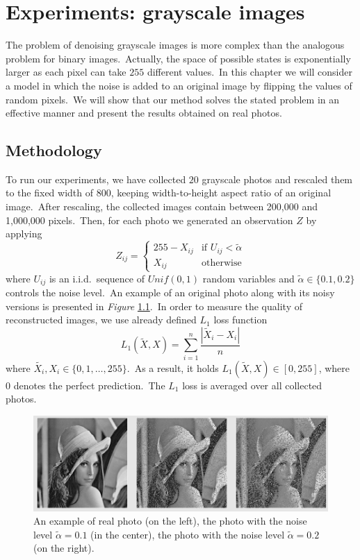 \documentclass[shortabstract, english, lic]{iithesis}
\newcommand\numberedchapter[1]{\setlength\topskip{3cm}\chapter{#1}\setlength\topskip{0cm}}
\theoremstyle{default_theorem_style}\newtheorem{theorem}{Theorem}
\theoremstyle{default_theorem_style}\newtheorem{definition}{Definition}
\begin{document}
\numberedchapter{Experiments: grayscale images}\label{chapter:grayscale_experiments}

The problem of denoising grayscale images is more complex than the analogous problem for binary
images.\ Actually, the space of possible states is exponentially larger as each pixel can take $255$ different
values.\ In this chapter we will consider a model in which the noise is added to an original image by flipping
the values of random pixels.\ We will show that our method solves the stated problem in an effective manner
and present the results obtained on real photos.

\section{Methodology}

To run our experiments, we have collected $20$ grayscale photos and rescaled them to the fixed width of $800$,
keeping width-to-height aspect ratio of an original image.\ After rescaling, the collected images contain between
200,000 and 1,000,000 pixels.\ Then, for each photo we generated an observation $Z$ by applying
$$
Z_{ij} =
\begin{cases}
  255 - X_{ij} &\text{if $U_{ij} < \tilde{\alpha}$}\\
  X_{ij} &\text{otherwise}
\end{cases}
$$
where $U_{ij}$ is an i.i.d.\ sequence of $Unif(0, 1)$ random variables and $\tilde{\alpha} \in \{0.1, 0.2\}$ controls
the noise level.\ An example of an original photo along with its noisy versions is presented
in \textit{Figure} \ref{fig:grayscale_data_examples}.\ In order to measure the quality of reconstructed images,
we use already defined $L_1$ loss function
$$
L_1(\tilde{X}, X) = \sum\limits_{i = 1}^n \frac{|\tilde{X}_i - X_i|}{n}
$$
where $\tilde{X_i}, X_i \in \{0, 1,  \dots, 255\}$.\ As a result, it holds $L_1(\tilde{X}, X) \in [0,255]$, where 0
denotes the perfect prediction.\ The $L_1$ loss is averaged over all collected
photos.\newline\newline\newline\newline\newline

\begin{figure}[H]
\centering
\includegraphics[scale=0.43]{grayscale_data_examples}
\caption{An example of real photo (on the left), the photo with the noise level $\tilde{\alpha} = 0.1$
(in the center), the photo with the noise level $\tilde{\alpha} = 0.2$ (on the right).}
\label{fig:grayscale_data_examples}
\end{figure}
\end{document}
